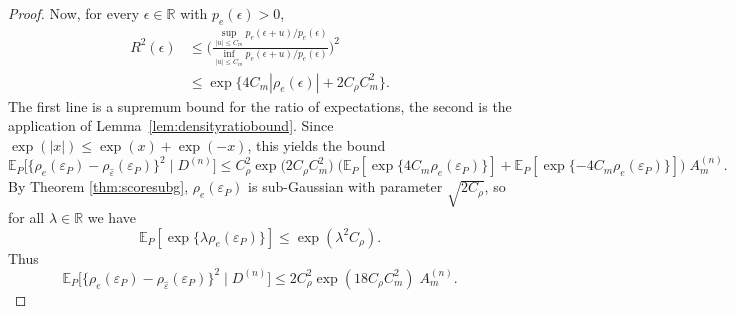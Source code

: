 \documentclass[aos]{imsart}
\newcommand{\R}{\mathbb{R}}
\newcommand{\E}{\mathbb{E}}
\begin{document}
\begin{proof}
		Now, for every $\epsilon\in\R$ with $p_{e}(\epsilon)>0$,
		\begin{align*}
			R^2(\epsilon) &\leq \bigg(\frac{\sup_{|u|\leq C_m} p_{e}(\epsilon + u) / p_{e}(\epsilon)}{\inf_{|u|\leq C_m} p_{e}(\epsilon + u) / p_{e}(\epsilon)}\bigg)^2\\
			&\leq \exp\big\{4C_m|\rho_{e}(\epsilon)| + 2C_\rho C_m^2\big\}.
		\end{align*}
		The first line is a supremum bound for the ratio of expectations, the second is the application of Lemma~\ref{lem:densityratiobound}. Since $\exp(|x|)\leq \exp(x)+\exp(-x)$, this yields the bound
		\begin{equation*}
			\E_P\Big[\big\{\rho_{e}(\varepsilon_P)-\rho_{\hat\varepsilon}(\varepsilon_P)\big\}^2 \; \Big| \; D^{(n)}\Big] \leq C_\rho^2 \exp\big(2C_\rho C_m^2\big) \;\big(\E_P[\exp\{4C_m \rho_{e}(\varepsilon_P)\}] + \E_P[\exp\{-4C_m \rho_{e}(\varepsilon_P)\}]\big) \;A_m^{(n)}.
		\end{equation*}
		By Theorem \ref{thm:scoresubg}, $\rho_{e}(\varepsilon_P)$ is sub-Gaussian with parameter $\sqrt{2C_\rho}$, so for all $\lambda\in\R$ we have \begin{equation*}
			\E_P[\exp\{\lambda \rho_{e}(\varepsilon_P)\}] \leq \exp(\lambda^2 C_\rho).
		\end{equation*}
		Thus
		\begin{equation*}
			\E_P\Big[\big\{\rho_{e}(\varepsilon_P)-\rho_{\hat\varepsilon}(\varepsilon_P)\big\}^2 \; \Big| \; D^{(n)}\Big] \leq 2C_\rho^2 \exp(18C_\rho C_m^2)  \;A_m^{(n)}.
		\end{equation*}
	\end{proof}
	
\end{document}
